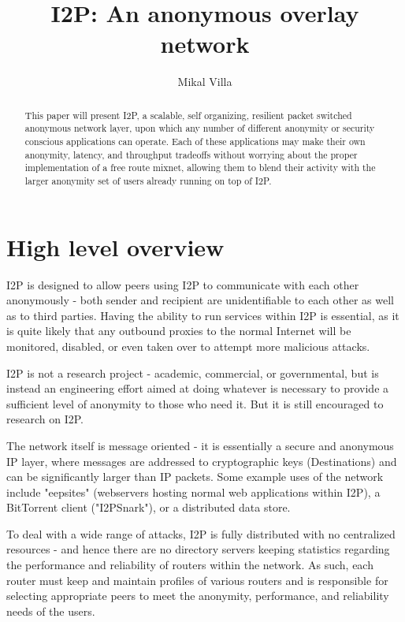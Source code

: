 \documentclass[a4paper,twocolumn,12pt]{article}
\title{I2P: An anonymous overlay network}
\author{Mikal Villa}
\begin{document}
\maketitle

\begin{abstract}\noindent
This paper will present I2P, a scalable, self organizing, resilient packet switched anonymous network layer, upon which any number of different anonymity or security conscious applications can operate. Each of these applications may make their own anonymity, latency, and throughput tradeoffs without worrying about the proper implementation of a free route mixnet, allowing them to blend their activity with the larger anonymity set of users already running on top of I2P.
\end{abstract}

\tableofcontents

\section{High level overview}

I2P is designed to allow peers using I2P to communicate with each other anonymously - both sender and recipient are unidentifiable to each other as well as to third parties. Having the ability to run services within I2P is essential, as it is quite likely that any outbound proxies to the normal Internet will be monitored, disabled, or even taken over to attempt more malicious attacks.

I2P is not a research project - academic, commercial, or governmental, but is instead an engineering effort aimed at doing whatever is necessary to provide a sufficient level of anonymity to those who need it. But it is still encouraged to research on I2P.

The network itself is message oriented - it is essentially a secure and anonymous IP layer, where messages are addressed to cryptographic keys (Destinations) and can be significantly larger than IP packets. Some example uses of the network include "eepsites" (webservers hosting normal web applications within I2P), a BitTorrent client ("I2PSnark"), or a distributed data store.

To deal with a wide range of attacks, I2P is fully distributed with no centralized resources - and hence there are no directory servers keeping statistics regarding the performance and reliability of routers within the network. As such, each router must keep and maintain profiles of various routers and is responsible for selecting appropriate peers to meet the anonymity, performance, and reliability needs of the users.
\end{document}
